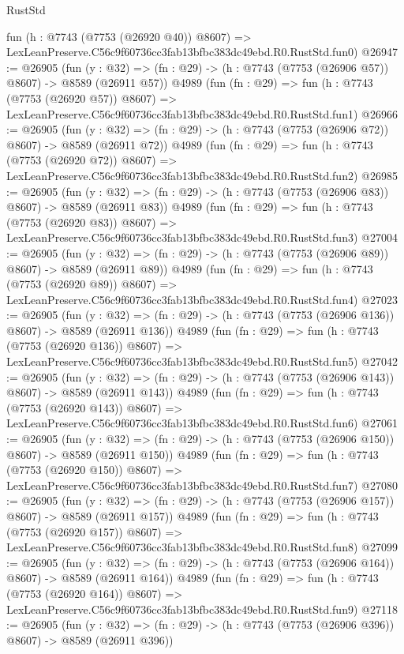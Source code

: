 \begin{lexlean}{RustStd}
\begin{coremodule}
    fun (h : @7743 (@7753 (@26920 @40)) @8607) =>
    LexLeanPreserve.C56c9f60736cc3fab13bfbc383dc49ebd.R0.RustStd.fun0)
@26947 := @26905
    (fun (y : @32) => (fn : @29) -> (h : @7743 (@7753 (@26906 @57)) @8607) -> @8589 (@26911 @57))
    @4989
    (fun (fn : @29) =>
    fun (h : @7743 (@7753 (@26920 @57)) @8607) =>
    LexLeanPreserve.C56c9f60736cc3fab13bfbc383dc49ebd.R0.RustStd.fun1)
@26966 := @26905
    (fun (y : @32) => (fn : @29) -> (h : @7743 (@7753 (@26906 @72)) @8607) -> @8589 (@26911 @72))
    @4989
    (fun (fn : @29) =>
    fun (h : @7743 (@7753 (@26920 @72)) @8607) =>
    LexLeanPreserve.C56c9f60736cc3fab13bfbc383dc49ebd.R0.RustStd.fun2)
@26985 := @26905
    (fun (y : @32) => (fn : @29) -> (h : @7743 (@7753 (@26906 @83)) @8607) -> @8589 (@26911 @83))
    @4989
    (fun (fn : @29) =>
    fun (h : @7743 (@7753 (@26920 @83)) @8607) =>
    LexLeanPreserve.C56c9f60736cc3fab13bfbc383dc49ebd.R0.RustStd.fun3)
@27004 := @26905
    (fun (y : @32) => (fn : @29) -> (h : @7743 (@7753 (@26906 @89)) @8607) -> @8589 (@26911 @89))
    @4989
    (fun (fn : @29) =>
    fun (h : @7743 (@7753 (@26920 @89)) @8607) =>
    LexLeanPreserve.C56c9f60736cc3fab13bfbc383dc49ebd.R0.RustStd.fun4)
@27023 := @26905
    (fun (y : @32) => (fn : @29) -> (h : @7743 (@7753 (@26906 @136)) @8607) -> @8589 (@26911 @136))
    @4989
    (fun (fn : @29) =>
    fun (h : @7743 (@7753 (@26920 @136)) @8607) =>
    LexLeanPreserve.C56c9f60736cc3fab13bfbc383dc49ebd.R0.RustStd.fun5)
@27042 := @26905
    (fun (y : @32) => (fn : @29) -> (h : @7743 (@7753 (@26906 @143)) @8607) -> @8589 (@26911 @143))
    @4989
    (fun (fn : @29) =>
    fun (h : @7743 (@7753 (@26920 @143)) @8607) =>
    LexLeanPreserve.C56c9f60736cc3fab13bfbc383dc49ebd.R0.RustStd.fun6)
@27061 := @26905
    (fun (y : @32) => (fn : @29) -> (h : @7743 (@7753 (@26906 @150)) @8607) -> @8589 (@26911 @150))
    @4989
    (fun (fn : @29) =>
    fun (h : @7743 (@7753 (@26920 @150)) @8607) =>
    LexLeanPreserve.C56c9f60736cc3fab13bfbc383dc49ebd.R0.RustStd.fun7)
@27080 := @26905
    (fun (y : @32) => (fn : @29) -> (h : @7743 (@7753 (@26906 @157)) @8607) -> @8589 (@26911 @157))
    @4989
    (fun (fn : @29) =>
    fun (h : @7743 (@7753 (@26920 @157)) @8607) =>
    LexLeanPreserve.C56c9f60736cc3fab13bfbc383dc49ebd.R0.RustStd.fun8)
@27099 := @26905
    (fun (y : @32) => (fn : @29) -> (h : @7743 (@7753 (@26906 @164)) @8607) -> @8589 (@26911 @164))
    @4989
    (fun (fn : @29) =>
    fun (h : @7743 (@7753 (@26920 @164)) @8607) =>
    LexLeanPreserve.C56c9f60736cc3fab13bfbc383dc49ebd.R0.RustStd.fun9)
@27118 := @26905
    (fun (y : @32) => (fn : @29) -> (h : @7743 (@7753 (@26906 @396)) @8607) -> @8589 (@26911 @396))

\end{coremodule}
\end{lexlean}
